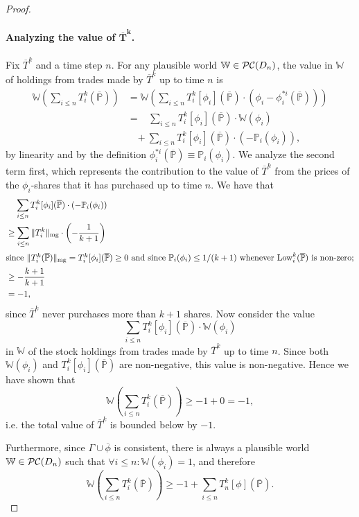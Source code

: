 \documentclass[authordate,onecolumn,noenvironments]{miri-tech-article}
\numberwithin{equation}{subsection}
\newcommand{\seq}[1]{{\overline{#1}}}
\newcommand{\phis}{\seq{\phi}}
\newcommand{\trade}{T}%
\newcommand{\Trader}{\seq{\trade}} %
\newcommand{\magnit}[1]{{\|#1\|_{\rm mg}}} %
\newcommand{\BelState}{\mathbb{P}}
\newcommand{\pt}{\BelState}
\newcommand{\MP}{\seq{\pt}}
\newcommand{\dt}{D}
\newcommand{\pcworlds}{\mathcal{P\-C}}
\newcommand{\World}{\mathbb{W}}
\newcommand{\Theory}{\Gamma}
\newcommand{\lowprice}{{\rm Low}}
\begin{document}
\begin{proof}
\paragraph{Analyzing the value of $\bm{\Trader^k}$.} 
Fix $\Trader^k$ and a time step $n$. 
For any plausible world $\World \in \pcworlds(\dt_{n})$, the value in $\World$ of holdings from trades made by $\Trader^k$ up to time $n$ is
%
\begin{align*}
\World\left({\textstyle \sum_{i \leq n} \trade^k_i(\MP) }\right) 
&= 
\World\left({\textstyle \sum_{i \leq n} \trade^k_i[\phi_i](\MP) \cdot (\phi_i - \phi_i^{* i}(\MP)) }\right) \\
&= \;\;\;
\sum_{i \leq n} \trade^k_i[\phi_i](\MP)  \cdot \World(\phi_i)\\
&\;\;\;
+ \sum_{i \leq n}\trade^k_i[\phi_i](\MP)  \cdot (-\pt_i(\phi_i)),
\end{align*}
%
by linearity and by the definition $ \phi_i^{* i }(\MP) \equiv   \pt_i (\phi_i)$. 
We analyze the second term first, which represents the contribution to the value of $\Trader^k$ from the prices of the $\phi_i$-shares that it has purchased
up to time $n$. 
We have that 
\begin{align*}
&\;\;\;\;  
\sum_{i \leq n}\trade^k_i[\phi_i](\MP)  \cdot (-\pt_i(\phi_i))\\
&\geq   \sum_{i \leq n} 
\magnit{\trade^k_i} \cdot \left( - \frac{1}{k+1} \right) \\
\shortintertext{since $\magnit{\trade^k_i(\MP)} = \trade^k_i[\phi_i](\MP) \ge 0$ and since   $ \pt_i (\phi_i) \leq 1/(k+1)$ whenever $\lowprice^k_i(\MP)$ is non-zero;}
&\geq   - \frac{k+1}{k+1} \\
&= -1,
\end{align*}
%
since $\Trader^k$ never purchases more than $k+ 1$ shares.  Now consider the value 
%
\[\sum_{i \leq n} \trade^k_i[\phi_i](\MP)  \cdot \World(\phi_i)\]
%
in $\World$ of the stock holdings
from trades made by $\Trader^k$ up to time $n$. Since both $\World(\phi_i)$  and $\trade^k_i[\phi_i](\MP) $ are non-negative, this value is
non-negative. Hence we have shown that 
%
\[\World\left({\textstyle \sum_{i \leq n} \trade^k_i(\MP) }\right)  \geq  -1 + 0 = -1 ,\]
%
i.e. the total value of $\Trader^k$ is bounded below by $-1$. 

Furthermore, since $\Theory \cup \phis$ is consistent, there is always a plausible world 
$\World \in \pcworlds(\dt_{n})$ such that $\forall i\leq n: \World(\phi_i) = 1$, and therefore  
%
\[\World\left({\textstyle \sum_{i \leq n} \trade^k_i(\MP) }\right)  \geq  -1 + 
\sum_{i \leq n} \trade^k_n[\phi](\MP).\]




\end{proof}
\end{document}
